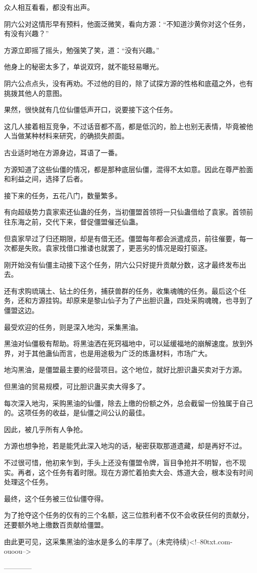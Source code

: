\begin{this_body}
众人相互看看，都没有出声。

阴六公对这情形早有预料，他面泛微笑，看向方源：“不知道沙黄你对这个任务，有没有兴趣？”

方源立即摇了摇头，勉强笑了笑，道：“没有兴趣。”

他身上的秘密太多了，单说双窍，就不能轻易曝光。

阴六公点点头，没有再劝。不过他的目的，除了试探方源的性格和底蕴之外，也有挑拨其他人的意图。

果然，很快就有几位仙僵低声开口，说要接下这个任务。

这几人接着相互竞争，不过话音都不高，都是低沉的，脸上也别无表情，毕竟被他人当做某种材料来研究，的确损失颜面。

古业适时地在方源身边，耳语了一番。

方源知道了这些仙僵的情况，都是那种底层仙僵，混得不太如意。因此在尊严脸面和利益之间，选择了后者。

接下来的任务，五花八门，数量繁多。

有向超级势力袁家索还仙蛊的任务，当初僵盟首领将一只仙蛊借给了袁家。首领前往东海之前，交代下来，督促僵盟催还仙蛊。

但袁家早过了归还期限，却是有借无还。僵盟每年都会派遣成员，前往催要，每一次都是失败。袁家找借口推诿也就罢了，更恶劣的情况是殴打驱逐。

刚开始没有仙僵主动接下这个任务，阴六公只好提升贡献分数，这才最终发布出去。

还有求购琉璃土、钻土的任务，捕获兽群的任务，收集魂魄的任务。最后这个任务，还和方源挂钩。却原来是黎山仙子为了产出胆识蛊，四处采购魂魄，也寻到了僵盟这边。

最受欢迎的任务，则是深入地沟，采集黑油。

黑油对仙僵极有帮助。将黑油洒在死窍福地中，可以延缓福地的崩解速度。放到外界，对于其他蛊仙而言，也是用途极为广泛的炼蛊材料，市场广大。

地沟黑油，是僵盟最主要的经营项目。这个地位，就好比胆识蛊买卖对于方源。

但黑油的贸易规模，可比胆识蛊买卖大得多了。

每次深入地沟，采购黑油的仙僵，除去上缴的份额之外，总会截留一份独属于自己的。这项任务的收益，是仙僵之间公认的最佳。

因此，被几乎所有人争抢。

方源也想争抢，若是能凭此深入地沟的话，秘密获取那道遗藏，却是再好不过。

不过很可惜，他初来乍到，手头上还没有僵盟令牌，盲目争抢并不明智，也不现实。再者，这个任务有着时限。现在方源忙着拍卖大会、炼道大会，根本没有时间处理这个任务。

最终，这个任务被三位仙僵夺得。

为了抢夺这个任务的仅有的三个名额，这三位胜利者不仅不会收获任何的贡献分，还要额外地上缴数百贡献给僵盟。

由此更可见，这采集黑油的油水是多么的丰厚了。(未完待续)<!--80txt.com-ouoou-->

------------

\end{this_body}

